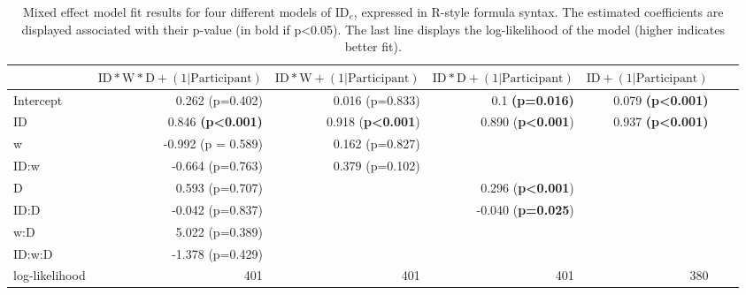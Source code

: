 \documentclass[acmlarge, manuscript,review]{acmart}
\newcommand{\ide}{\ensuremath{{\text{ID}_e}}\xspace}
\newcommand{\D}{\ensuremath{{\text{D}}}\xspace}
\newcommand{\W}{\ensuremath{{\text{W}}}\xspace}
\begin{document}
\begin{table}
	\caption{Mixed effect model fit results for four different models of \ide, expressed in R-style formula syntax. The estimated coefficients are displayed associated with their p-value (in bold if p<0.05). The last line displays the log-likelihood of the model (higher indicates better fit).}
	\label{tab:fit_jgp_ide_id}
\begin{center}
	\begin{tabular}{lrrrrrr}
	\hline
		  &  $\text{ID}*\W*\D + (1|\text{Participant})$ & $\text{ID}*\W + (1|\text{Participant})$ & $\text{ID}*\D + (1 | \text{Participant})$ & $\text{ID}+ (1 | \text{Participant})$  \\
	\hline
	Intercept &  0.262 (p=0.402) &    				0.016 (p=0.833) &  0.1 \textbf{(p=0.016)} & 0.079 \textbf{(p\textless0.001)} \\
	ID        &  0.846 \textbf{(p\textless0.001)} &    0.918 (\textbf{p\textless0.001}) &  0.890 (\textbf{p\textless0.001}) & 0.937 \textbf{(p\textless0.001)}  \\
	w         & -0.992 (p = 0.589) & 0.162 (p=0.827)    &   & \\
	ID:w      & -0.664 (p=0.763) &    0.379 (p=0.102)  &   & \\
	D         &  0.593 (p=0.707) &    &  0.296 (\textbf{p\textless0.001})  & \\
	ID:D      & -0.042 (p=0.837) &     & -0.040 (\textbf{p=0.025})  & \\
	w:D       &  5.022 (p=0.389) &     &  &   \\
	ID:w:D    & -1.378 (p=0.429) &     &   & \\
	log-likelihood & 401 & 401 & 401  & 380\\
	\hline
	\end{tabular}
	\end{center}
	\end{table}


\end{document}
